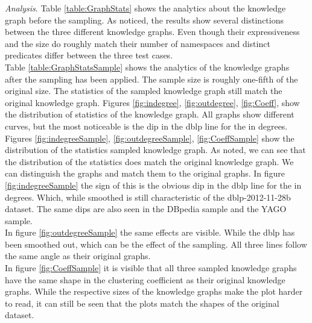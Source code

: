 \documentclass[11pt,letterpaper ,oneside ]{book}
\begin{document}
	
\begin{table}[!t]
	\centering
	\caption{table showing several statistics about graphs.}
	\label{table:GraphStatsSample}
\end{table}
	
	\textit{Analysis}. Table \ref{table:GraphStats} shows the analytics about the knowledge graph before the sampling. As noticed, the results show several distinctions between the three different knowledge graphs. Even though their expressiveness and the size do roughly match their number of namespaces and distinct predicates differ between the three test cases.\\
	Table \ref{table:GraphStatsSample} shows the analytics of the knowledge graphs after the sampling has been applied. The sample size is roughly one-fifth of the original size. The statistics of the sampled knowledge graph still match the original knowledge graph.
	Figures \ref{fig:indegree},  \ref{fig:outdegree},  \ref{fig:Coeff}, show the distribution of statistics of the knowledge graph. All graphs show different curves, but the most noticeable is the dip in the dblp line for the in degrees. 
	Figures \ref{fig:indegreeSample},  \ref{fig:outdegreeSample},  \ref{fig:CoeffSample} show the distribution of the statistics sampled knowledge graph. As noted, we can see that the distribution of the statistics does match the original knowledge graph. We can distinguish the graphs and match them to the original graphs. 
	In figure \ref{fig:indegreeSample} the sign of this is the obvious dip in the dblp line for the in degrees. Which, while smoothed is still characteristic of the dblp-2012-11-28b dataset. The same dips are also seen in the DBpedia sample and the YAGO sample.\\
	In figure \ref{fig:outdegreeSample} the same effects are visible. While the dblp has been smoothed out, which can be the effect of the sampling. All three lines follow the same angle as their original graphs.\\
	In figure \ref{fig:CoeffSample} it is visible that all three sampled knowledge graphs have the same shape in the clustering coefficient as their original knowledge graphs. While the respective sizes of the knowledge graphs make the plot harder to read, it can still be seen that the plots match the shapes of the original dataset.
	
\end{document}
